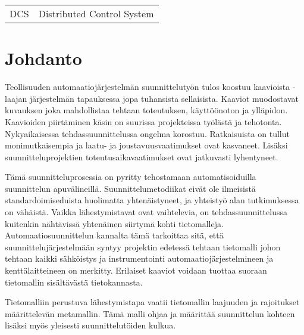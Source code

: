 \documentclass[finnish,12pt]{article}
\begin{document}

	\begin{tabular}{ll}
DCS        & Distributed Control System \\

	\end{tabular}

	\cleardoublepage
	\storeinipagenumber
	\setcounter{page}{1}


	\section{Johdanto}
	\thispagestyle{empty}

Teollisuuden automaatiojärjestelmän suunnittelutyön tulos koostuu kaavioista -
laajan järjestelmän tapauksessa jopa tuhansista sellaisista. Kaaviot muodostavat
kuvauksen joka mahdollistaa tehtaan toteutuksen, käyttöönoton ja ylläpidon.
Kaavioiden piirtäminen käsin on suurissa projekteissa työlästä ja tehotonta.
Nykyaikaisessa tehdassuunnittelussa ongelma korostuu.
Ratkaisuista on tullut monimutkaisempia ja laatu- ja joustavuusvaatimukset ovat kasvaneet.
Lisäksi suunnitteluprojektien toteutusaikavaatimukset ovat jatkuvasti lyhentyneet.
\cite{RefWorks:41}

Tämä suunnitteluprosessia on pyritty tehostamaan automatisoiduilla
suunnittelun apuvälineillä. Suunnittelumetodiikat eivät ole
ilmeisistä standardoimiseduista huolimatta yhtenäistyneet, ja yhteistyö alan
tutkimuksessa on vähäistä. Vaikka lähestymistavat ovat vaihtelevia, on
tehdassuunnittelussa kuitenkin nähtävissä yhtenäinen siirtymä kohti 
tietomalleja. Automaatiosuunnittelun kannalta tämä tarkoittaa sitä, että
suunnittelujärjestelmään syntyy projektin edetessä tehtaan
tietomalli johon tehtaan kaikki sähköistys ja instrumentointi
automaatiojärjestelmineen ja kenttälaitteineen on merkitty. Erilaiset kaaviot
voidaan tuottaa suoraan tietomallin sisältävästä tietokannasta.

Tietomalliin perustuva lähestymistapa vaatii tietomallin laajuuden ja rajoitukset
määrittelevän metamallin. Tämä malli ohjaa ja määrittää suunnittelun kohteen lisäksi
myös yleisesti suunnittelutöiden kulkua.
\end{document}
